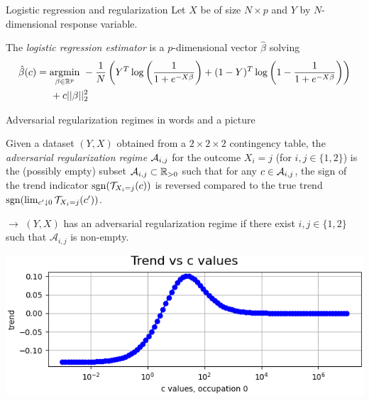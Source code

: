 \begin{frame}{Logistic regression and regularization}
  Let $X$ be of size $N\times p$ and $Y$ by $N$-dimensional response variable.

  The \emph{logistic regression estimator} is a $p$-dimensional vector $\hat{\beta}$ solving
  \begin{align*}
    \label{equ:optimizationLR}
    \hat{\beta}(c) &= \underset{\beta\in\mathbb{R}^p}{\operatorname{argmin}}~ -\frac{1}{N} \left( Y^T \log\left(\frac{1}{1 + e^{-X\beta}}\right) + (1 - Y)^T \log\left(1 - \frac{1}{1 + e^{-X\beta}}\right) \right) \\
    & \hspace{0.5cm} + c||\beta||^2_2
  \end{align*}
\end{frame}

\begin{frame}{Adversarial regularization regimes in words and a picture}
\begin{definition}
  Given a dataset $(Y,X)$ obtained from a $2\times 2\times 2$ contingency table, the \emph{adversarial regularization regime} $\mathcal{A}_{i,j}$ for the outcome $X_i=j$ (for $i,j\in\{1,2\}$) is the (possibly empty) subset $\mathcal{A}_{i,j}\subset \mathbb{R}_{>0}$ such that for any $c\in\mathcal{A}_{i,j}$, the sign of the trend indicator $\operatorname{sgn}(\mathcal{T}_{X_i=j}(c))$ is reversed compared to the true trend $\operatorname{sgn}(\lim_{c^{\prime}\downarrow 0} \mathcal{T}_{X_i=j}(c^{\prime}))$.
\end{definition}

$\rightarrow$ $(Y,X)$ has an adversarial regularization regime if there exist $i,j \in \{1,2\}$ such that $\mathcal{A}_{i,j}$ is non-empty.

\begin{center}
  \includegraphics[height=0.3\textheight]{graphics/data-from-counts-simpson-154}
\end{center}

\end{frame}

